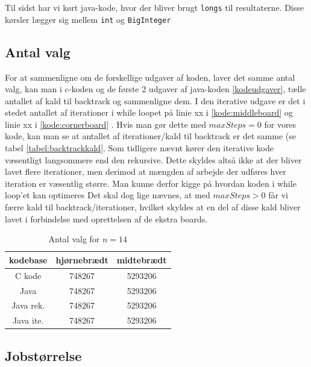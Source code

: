 Til sidst har vi kørt java-kode, hvor der bliver brugt \texttt{longs} til
resultaterne. Disse kørsler lægger sig mellem \texttt{int} og
\texttt{BigInteger}

\subsection{Antal valg}

For at sammenligne om de forskellige udgaver af koden, laver det samme antal
valg, kan man i c-koden og de første 2 udgaver af java-koden
\ref{kodeudgaver}, tælle antallet af kald til backtrack og sammenligne dem.  I
den iterative udgave er det i stedet antallet af iterationer i while loopet på
linie xx i \ref{kode:middleboard} og linie xx i \ref{kode:cornerboard}
. Hvis man gør dette med $maxSteps=0$ for vores kode,
kan man se at antallet af iterationer/kald til backtrack er det samme (se tabel
\ref{tabel:backtrackkald}. Som tidligere nævnt kører den iterative kode
væsentligt langsommere end den rekursive. Dette skyldes altså ikke at der bliver
lavet flere iterationer, men derimod at mængden af arbejde der udføres hver
iteration er væsentlig større. Man kunne derfor kigge på hvordan koden i while
loop'et kan optimeres Det skal dog lige nævnes, at med $maxSteps>0$ får vi færre
kald til backtrack/iterationer, hvilket skyldes at en del af disse kald bliver
lavet i forbindelse med oprettelsen af de ekstra boards. 

\begin{table}
\begin{center}
\begin{tabular}{|c|c|c|}
\hline kodebase  & hjørnebrædt & midtebrædt \\
\hline C kode    &  748267           &  5293206           \\
\hline Java      &  748267           &  5293206           \\
\hline Java rek. &  748267           &  5293206           \\
\hline Java ite. &  748267           &  5293206           \\
\hline
\end{tabular}
\caption{Antal valg for $n=14$}
\label{table:backtrackkald}
\end{center}
\end{table}

\subsection{Jobstørrelse}

